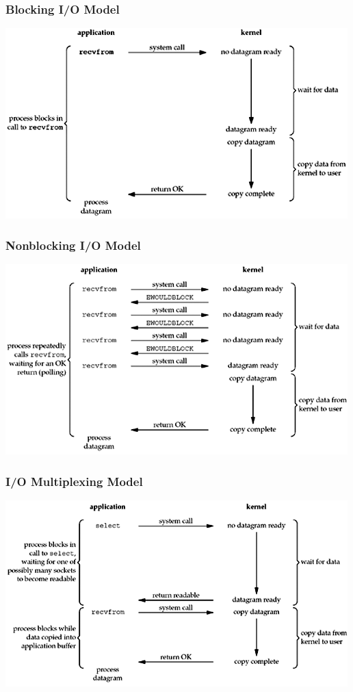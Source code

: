 \documentclass[notes,serif]{beamer}
\begin{document}
\begin{frame}
\frametitle{Blocking I/O Model}
  \begin{center}
  \includegraphics[width=.9\textwidth]{figs/06fig01.png}
  \end{center}
\end{frame}

\begin{frame}
\frametitle{Nonblocking I/O Model}
  \begin{center}
  \includegraphics[width=.9\textwidth]{figs/06fig02.png}
  \end{center}
\end{frame}

\begin{frame}
\frametitle{I/O Multiplexing Model}
  \begin{center}
  \includegraphics[width=.9\textwidth]{figs/06fig03.png}
  \end{center}
\end{frame}
\end{document}

